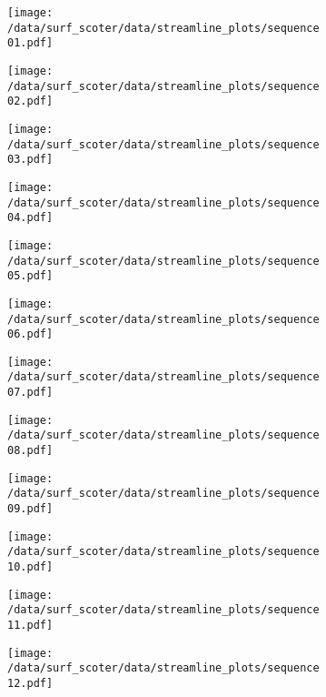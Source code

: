 \begin{figure}[h]
	\begin{subfigure}[t]{0.5\textwidth}
		\centering
		\texttt{[image: /data/surf\_scoter/data/streamline\_plots/sequence01.pdf]}
	\end{subfigure}%
	\begin{subfigure}[t]{0.5\textwidth}
		\centering
		\texttt{[image: /data/surf\_scoter/data/streamline\_plots/sequence02.pdf]}
	\end{subfigure}
	\begin{subfigure}[t]{0.5\textwidth}
		\centering
		\texttt{[image: /data/surf\_scoter/data/streamline\_plots/sequence03.pdf]}
	\end{subfigure}%
	\begin{subfigure}[t]{0.5\textwidth}
		\centering
		\texttt{[image: /data/surf\_scoter/data/streamline\_plots/sequence04.pdf]}
	\end{subfigure}
	\begin{subfigure}[t]{0.5\textwidth}
		\centering
		\texttt{[image: /data/surf\_scoter/data/streamline\_plots/sequence05.pdf]}
	\end{subfigure}%
	\begin{subfigure}[t]{0.5\textwidth}
		\centering
		\texttt{[image: /data/surf\_scoter/data/streamline\_plots/sequence06.pdf]}
	\end{subfigure}
\end{figure}

\begin{figure}[h]
	\begin{subfigure}[t]{0.5\textwidth}
		\centering
		\texttt{[image: /data/surf\_scoter/data/streamline\_plots/sequence07.pdf]}
	\end{subfigure}%
	\begin{subfigure}[t]{0.5\textwidth}
		\centering
		\texttt{[image: /data/surf\_scoter/data/streamline\_plots/sequence08.pdf]}
	\end{subfigure}
	\begin{subfigure}[t]{0.5\textwidth}
		\centering
		\texttt{[image: /data/surf\_scoter/data/streamline\_plots/sequence09.pdf]}
	\end{subfigure}%
	\begin{subfigure}[t]{0.5\textwidth}
		\centering
		\texttt{[image: /data/surf\_scoter/data/streamline\_plots/sequence10.pdf]}
	\end{subfigure}
	\begin{subfigure}[t]{0.5\textwidth}
		\centering
		\texttt{[image: /data/surf\_scoter/data/streamline\_plots/sequence11.pdf]}
	\end{subfigure}%
	\begin{subfigure}[t]{0.5\textwidth}
		\centering
		\texttt{[image: /data/surf\_scoter/data/streamline\_plots/sequence12.pdf]}
	\end{subfigure}
\end{figure}

